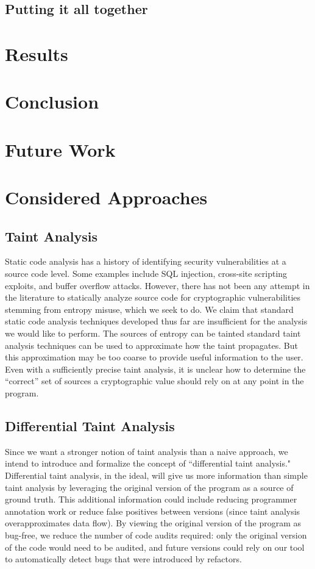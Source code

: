 \documentclass[letterpaper,twocolumn,10pt]{article}
\begin{document}
\subsection{Putting it all together}

\section{Results}

\section{Conclusion}

\section{Future Work}

\section{Considered Approaches}

\subsection{Taint Analysis}
Static code analysis has a history of identifying security vulnerabilities at a source code level. Some examples include SQL injection, cross-site scripting exploits, and buffer overflow attacks. However, there has not been any attempt in the literature to statically analyze source code for cryptographic vulnerabilities stemming from entropy misuse, which we seek to do. We claim that standard static code analysis techniques developed thus far are insufficient for the analysis we would like to perform. 
The sources of entropy can be tainted standard taint analysis techniques can be used to approximate how the taint propagates. But this approximation may be too coarse to provide useful information to the user. Even with a sufficiently precise taint analysis, it is unclear how to determine the ``correct'' set of sources a cryptographic value should rely on at any point in the program.

\subsection{Differential Taint Analysis}

Since we want a stronger notion of taint analysis than a naive approach, we intend to introduce and formalize the concept of ``differential taint analysis." Differential
taint analysis, in the ideal, will give us more information than simple taint analysis by leveraging 
the original version of the program as a source of ground truth. This additional information could include reducing programmer annotation work or reduce false positives between versions
(since taint analysis overapproximates data flow). By viewing the original version of the program as bug-free, we reduce the number of code audits required:
only the original version of the code would need to be audited, and future versions could rely on our tool to automatically detect bugs that were introduced by refactors.
\end{document}
